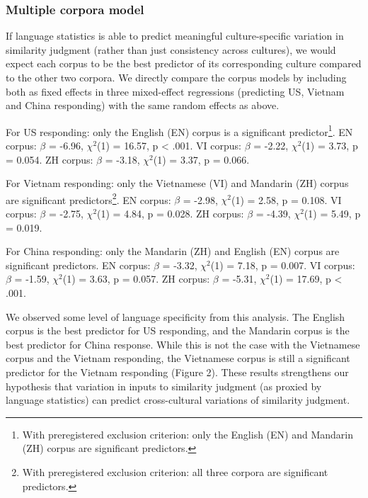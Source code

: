 \documentclass[10pt, letterpaper]{article}
\begin{document}
\hypertarget{multiple-corpora-model}{%
\subsubsection{Multiple corpora model}\label{multiple-corpora-model}}

If language statistics is able to predict meaningful culture-specific
variation in similarity judgment (rather than just consistency across
cultures), we would expect each corpus to be the best predictor of its
corresponding culture compared to the other two corpora. We directly
compare the corpus models by including both as fixed effects in three
mixed-effect regressions (predicting US, Vietnam and China responding)
with the same random effects as above.

For US responding: only the English (EN) corpus is a significant
predictor\footnote{With preregistered exclusion criterion: only the
  English (EN) and Mandarin (ZH) corpus are significant predictors.}. EN
corpus: \(\beta\) = -6.96, \(\chi^2\)(1) = 16.57, p \textless{} .001. VI
corpus: \(\beta\) = -2.22, \(\chi^2\)(1) = 3.73, p = 0.054. ZH corpus:
\(\beta\) = -3.18, \(\chi^2\)(1) = 3.37, p = 0.066.

For Vietnam responding: only the Vietnamese (VI) and Mandarin (ZH)
corpus are significant predictors\footnote{With preregistered exclusion
  criterion: all three corpora are significant predictors.}. EN corpus:
\(\beta\) = -2.98, \(\chi^2\)(1) = 2.58, p = 0.108. VI corpus: \(\beta\)
= -2.75, \(\chi^2\)(1) = 4.84, p = 0.028. ZH corpus: \(\beta\) = -4.39,
\(\chi^2\)(1) = 5.49, p = 0.019.

For China responding: only the Mandarin (ZH) and English (EN) corpus are
significant predictors. EN corpus: \(\beta\) = -3.32, \(\chi^2\)(1) =
7.18, p = 0.007. VI corpus: \(\beta\) = -1.59, \(\chi^2\)(1) = 3.63, p =
0.057. ZH corpus: \(\beta\) = -5.31, \(\chi^2\)(1) = 17.69, p
\textless{} .001.

We observed some level of language specificity from this analysis. The
English corpus is the best predictor for US responding, and the Mandarin
corpus is the best predictor for China response. While this is not the
case with the Vietnamese corpus and the Vietnam responding, the
Vietnamese corpus is still a significant predictor for the Vietnam
responding (Figure 2). These results strengthens our hypothesis that
variation in inputs to similarity judgment (as proxied by language
statistics) can predict cross-cultural variations of similarity
judgment.
\end{document}
